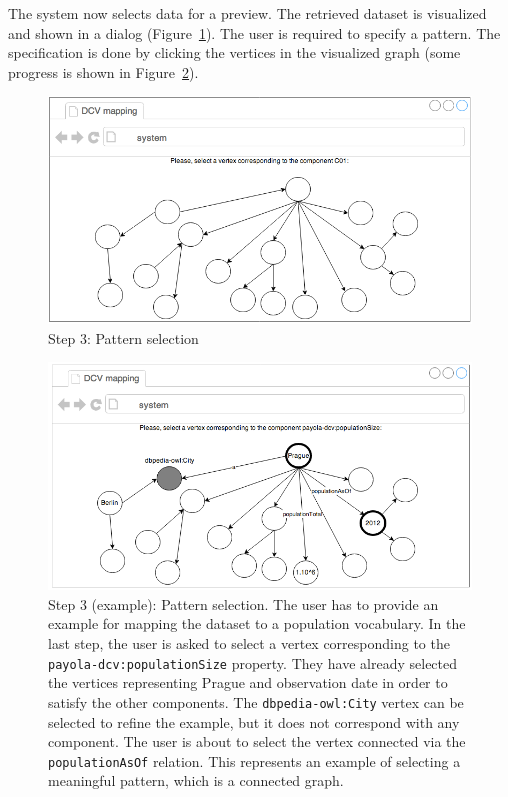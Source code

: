 The system now selects data for a preview. The retrieved dataset is 
visualized and shown in a dialog (Figure~\ref{fig:mockup-03}). The user is 
required to specify a pattern. The specification is done by clicking the vertices in 
the visualized graph (some progress is shown in Figure~\ref{fig:mockup-05}).

\begin{figure}
	\centering
	\includegraphics[width=120mm]{img/mockup-03.png}
	\caption{Step 3: Pattern selection}
	\label{fig:mockup-03}
\end{figure}
\begin{figure}
	\centering
	\includegraphics[width=120mm]{img/mockup-05.png}
	\caption{Step 3 (example): Pattern selection. The user has to provide an example
	for mapping the dataset to a population vocabulary. In the last step, the user is asked
	to select a vertex corresponding to the \texttt{payola-dcv:populationSize} property.
	They have already selected the vertices representing Prague and observation date
	in order to satisfy the other components. The \texttt{dbpedia-owl:City} vertex can
	be selected to refine the example, but it does not correspond with any component.
	The user is about to select the vertex connected via the \texttt{populationAsOf} 
	relation. This represents an example of selecting a meaningful pattern, which 
	is a connected graph.}
	\label{fig:mockup-05}
\end{figure}

